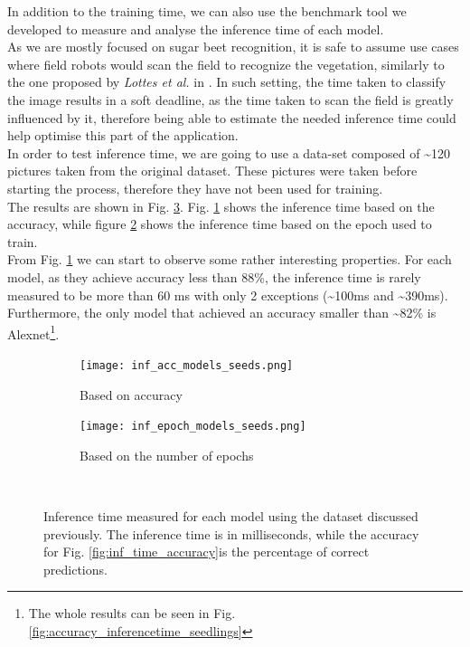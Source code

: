 In addition to the training time, we can also use the benchmark tool we developed to measure and analyse the inference time of each model.\\
As we are mostly focused on sugar beet recognition, it is safe to assume use cases where field robots would scan the field to recognize the vegetation, similarly to the one proposed by \textit{Lottes et al.} in \cite{7487720}. In such setting, the time taken to classify the image results in a soft deadline, as the time taken to scan the field is greatly influenced by it, therefore being able to estimate the needed inference time could help optimise this part of the application. \\
In order to test inference time, we are going to use a data-set composed of \textasciitilde120 pictures taken from the original dataset. These pictures were taken before starting the process, therefore they have not been used for training. \\
The results are shown in Fig. \ref{fig:inf_time_epoch_seeds}. Fig. \ref{fig:inf_acc_models_seeds} shows the inference time based on the accuracy, while figure \ref{fig:inf_epoch_models_seeds} shows the inference time based on the epoch used to train. \\
From Fig. \ref{fig:inf_acc_models_seeds} we can start to observe some rather interesting properties. For each model, as they achieve accuracy less than 88\%, the inference time is rarely measured to be more than 60 ms with only 2 exceptions (\textasciitilde100ms and \textasciitilde390ms). Furthermore, the only model that achieved an accuracy smaller than \textasciitilde82\% is Alexnet\footnote{The whole results can be seen in Fig. \ref{fig:accuracy_inferencetime_seedlings}}.
\begin{figure}[h]
     \begin{subfigure}{0.5\textwidth}
	    \texttt{[image: inf\_acc\_models\_seeds.png]}
	    \caption{Based on accuracy}
         \label{fig:inf_acc_models_seeds}
     \end{subfigure}
     \hfill
     \begin{subfigure}{0.5\textwidth}
	    \texttt{[image: inf\_epoch\_models\_seeds.png]}
	    \caption{Based on the number of epochs}
        \label{fig:inf_epoch_models_seeds}
     \end{subfigure}\\
     \caption[Inference time measured for each model]{Inference time measured for each model using the dataset discussed previously. The inference time is in milliseconds, while the accuracy for Fig. \ref{fig:inf_time_accuracy}is the percentage of correct predictions.}
        \label{fig:inf_time_epoch_seeds}
\end{figure}



